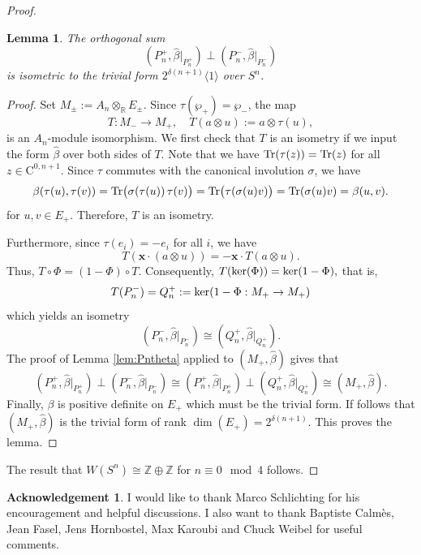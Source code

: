 \documentclass[psamsfonts]{amsart}
\theoremstyle{plain}
\theoremstyle{theorem}
\newtheorem{lem}[theo]{Lemma}
\theoremstyle{definition}
\newtheorem*{ackno}{Acknowledgement}
\newcommand{\C}{\mathrm{C}}
\newcommand{\Z}{\mathbb{Z}}
\newcommand{\tr}{\textnormal{Tr}}
\newcommand{\Ker}{\textnormal{ker}}
\newcommand{\W}{W}
\begin{document}
\begin{proof}
\begin{lem}\label{lem:spinor-decompose}
The orthogonal sum
\[(P_n^+,\hat\beta|_{P_n^+})\perp (P_n^-,\hat\beta|_{P_n^-})\]
is isometric to the trivial form $2^{\delta(n+1)} \langle 1 \rangle$ over $S^n$.
\end{lem}

\begin{proof}
Set $M_\pm:=A_n\otimes_{\mathbb R}E_\pm.$
Since $\tau(\wp_+)=\wp_-$, the map
\[ T:M_-\longrightarrow M_+,
\quad
T(a\otimes u):=a\otimes \tau(u), \]
is an $A_n$-module isomorphism. We first check that $T$ is an isometry if we input the form $\hat\beta$ over both sides of $T$. Note that we have
$\tr(\tau(z))=\tr(z)$
for all  $z\in \C^{0,n+1}$.
Since $\tau$ commutes with the canonical involution $\sigma$, we have
\[\beta(\tau(u),\tau(v))
= \tr \bigl(\sigma(\tau(u))\,\tau(v)\bigr)
= \tr \bigl(\tau(\sigma(u)v)\bigr)
= \tr(\sigma(u)v)
= \beta(u,v).\]
for $u,v\in E_+$. Therefore, $T$ is an isometry.

Furthermore, since $\tau(e_i)=-e_i$ for all $i$, we have
\[T(\mathbf{x}\cdot (a\otimes u))
=-\mathbf{x}\cdot T(a\otimes u).\]
Thus, $ T\circ \Phi=(1-\Phi)\circ T.$
Consequently,
$T(\Ker(\Phi))=\Ker(1-\Phi),$
that is,
\[T(P_n^-)=Q_n^+:=\Ker(1-\Phi:M_+\to M_+) \]
which yields an isometry
\[(P_n^-,\hat\beta|_{P_n^-})\cong (Q_n^+,\hat\beta|_{Q_n^+}).\]
The proof of Lemma \ref{lem:Pntheta} applied to $(M_+, \hat\beta)$ gives that
\[(P_n^+,\hat\beta|_{P_n^+})\perp (P_n^-,\hat\beta|_{P_n^-})
\cong (P_n^+,\hat\beta|_{P_n^+})\perp (Q_n^+,\hat\beta|_{Q_n^+})
\cong (M_+,\hat\beta).\]
Finally, $\beta$ is positive definite on $E_+$ which must be the trivial form. If follows that
$(M_+,\hat\beta)$
is the trivial form of rank $\dim(E_+)=2^{\delta(n+1)}$.
This proves the lemma.
\end{proof}
The result that $W(S^n) \cong \Z \oplus \Z$ for $n \equiv 0 \mod 4$ follows.  \end{proof}

	
	\begin{ackno}I would like to thank Marco Schlichting for his encouragement and helpful discussions. I also want to thank Baptiste Calm\`{e}s,
		Jean Fasel, 
		Jens Hornbostel, 
		Max Karoubi 
		and Chuck Weibel
		for useful comments.\ 
	\end{ackno}
	
\end{document}
